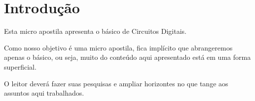 \chapter{Introdução}
\label{intro}

Esta micro apostila apresenta o básico de Circuitos Digitais. 

Como nosso objetivo é uma micro apostila, fica implícito que abrangeremos apenas o básico, ou seja, muito do conteúdo aqui apresentado está em uma forma superficial. 

O leitor deverá fazer suas pesquisas e ampliar horizontes no que tange aos assuntos aqui trabalhados.
